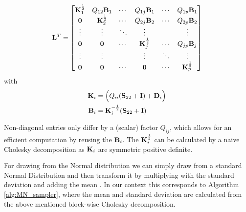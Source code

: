 \newcommand{\syyi}{(\Syy + \matr{I})}
\newcommand{\blockunw}[1]{\Big(Q_{#1#1}\syyi+\matr{D}_#1\Big)}
\[
	\mathbf{L}^T=
	\begin{bmatrix}
		\mathbf{K}_1^\frac{1}{2} & Q_{12} \mathbf{B}_1      & \cdots & Q_{1j} \mathbf{B}_1      & \cdots & Q_{1p} \mathbf{B}_1      \\
		\mathbf{0}               & \mathbf{K}_2^\frac{1}{2} & \cdots & Q_{2j} \mathbf{B}_2      & \cdots & Q_{2p} \mathbf{B}_2      \\
		\vdots                 & \vdots                 & \ddots & \vdots                 &        & \vdots                 \\
		\mathbf{0}               & \mathbf{0}               & \cdots & \mathbf{K}_j^\frac{1}{2} & \cdots & Q_{jp} \mathbf{B}_j      \\
		\vdots                 & \vdots                 &        & \vdots                 & \ddots & \vdots                 \\
		\mathbf{0}               & \mathbf{0}               & \cdots & \mathbf{0}               & \cdots & \mathbf{K}_p^\frac{1}{2} 
	\end{bmatrix}
\]
with
\begin{align*}
	\matr{K}_i & = \blockunw{i}                   
	\\
	\matr{B}_i & = \matr{K}_i^{-\frac{1}{2}}\syyi 
\end{align*}

Non-diagonal entries only differ by a (scalar) factor $Q_{ij}$, which allows for an efficient computation by reusing the $\mathbf{B}_i$.
The $\mathbf{K}_i^{\frac{1}{2}}$ can be calculated by a naive Cholesky decomposition as $\mathbf{K}_i$ are symmetric positive definite.

For drawing from the Normal distribution we can simply draw from a standard Normal Distribution and then transform it by multiplying with the standard deviation and adding the mean \cite[Chapter 7.4]{gentle2009computational}.
In our context this corresponds to Algorithm \autoref{alg:MN_sampler},
where the mean and standard deviation are calculated from the above mentioned block-wise Cholesky decomposition.



